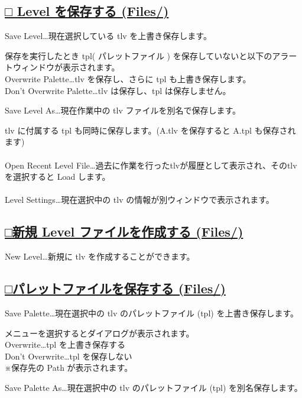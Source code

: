 \documentclass[a4paper,10pt]{article}
\begin{document}
\subsection*{\uline{□ Level を保存する (Files/)}}

\normalsize
\noindent Save Level…現在選択している tlv を上書き保存します。\par
\footnotesize
\noindent 保存を実行したとき tpl( パレットファイル ) を保存していないと以下のアラートウィンドウが表示されます。\\
Overwrite Palette…tlv を保存し、さらに tpl も上書き保存します。\\
Don't Overwrite Palette…tlv は保存し、tpl は保存しません。\\[-0.7em]
\par
\normalsize
\noindent Save Level As…現在作業中の tlv ファイルを別名で保存します。\par
\footnotesize
\noindent tlv に付属する tpl も同時に保存します。(A.tlv を保存すると A.tpl も保存されます)\\[-1em]
\\
\normalsize
Open Recent Level File…過去に作業を行ったtlvが履歴として表示され、そのtlvを選択すると Load します。\\[-0.6em]
\\
Level Settings…現在選択中の tlv の情報が別ウィンドウで表示されます。\\[-0.5em]

\subsection*{\uline{□新規 Level ファイルを作成する (Files/)}}

\noindent New Level…新規に tlv を作成することができます。\\[-0.7em]

\subsection*{\uline{□パレットファイルを保存する (Files/)}}

\noindent Save Palette…現在選択中の tlv のパレットファイル (tpl) を上書き保存します。\par
\footnotesize
\noindent メニューを選択するとダイアログが表示されます。\\
Overwrite…tpl を上書き保存する\\
Don't Overwrite…tpl を保存しない\\
※保存先の Path が表示されます。\\[-1.2em]
\par
\normalsize
\noindent Save Palette As…現在選択中の tlv のパレットファイル (tpl) を別名保存します。
\end{document}
